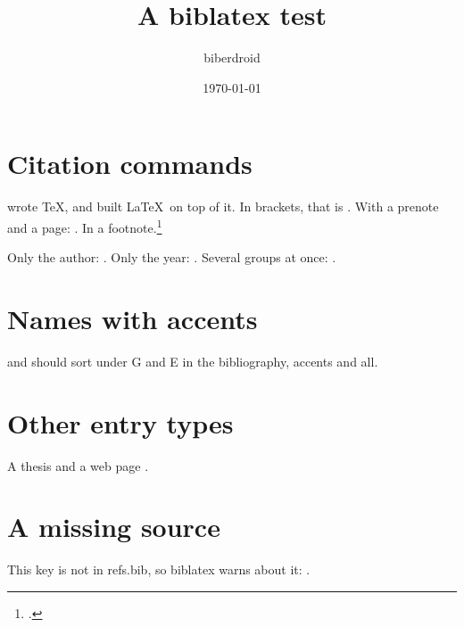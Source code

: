 \documentclass[11pt]{article}
\title{A biblatex test}
\author{biberdroid}
\date{\today}
\begin{document}
\maketitle

\section{Citation commands}

\textcite{knuth1984} wrote \TeX, and \textcite{lamport1994} built \LaTeX\
on top of it. In brackets, that is \parencite{knuth1984, lamport1994}.
With a prenote and a page: \autocite[see][42]{knuth1984}. In a
footnote.\footcite{shannon1948}

Only the author: \citeauthor{turing1937}. Only the year:
\citeyear{turing1937}. Several groups at once:
\cites[1]{godel1931}[173]{erdos1959}.

\section{Names with accents}

\textcite{godel1931} and \textcite{erdos1959} should sort under G and E
in the bibliography, accents and all.

\section{Other entry types}

A thesis \parencite{shannon1940} and a web page \parencite{biblatex,nojournal,typo2001}.

\section{A missing source}

This key is not in refs.bib, so biblatex warns about it:
\autocite{missing2024}.

\printbibliography[type=article, title={Articles}]
\printbibliography[nottype=article, title={Books and other sources}]
\end{document}
